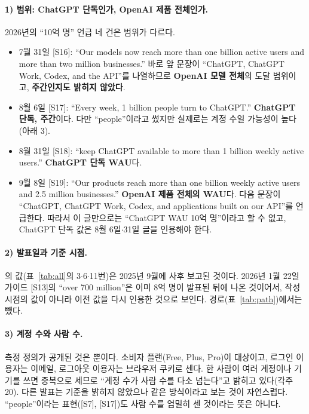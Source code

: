 \documentclass[11pt]{article}
\begin{document}
\paragraph{1) 범위: ChatGPT 단독인가, OpenAI 제품 전체인가.} 2026년의 ``10억 명'' 언급 네 건은 범위가 다르다.
\begin{itemize}
  \item 7월 31일 [S16]: ``Our models now reach more than one billion active users and more than two million businesses.'' 바로 앞 문장이 ``ChatGPT, ChatGPT Work, Codex, and the API''를 나열하므로 \textbf{OpenAI 모델 전체}의 도달 범위이고, \textbf{주간인지도 밝히지 않았다}.
  \item 8월 6일 [S17]: ``Every week, 1 billion people turn to ChatGPT.'' \textbf{ChatGPT 단독, 주간}이다. 다만 ``people''이라고 썼지만 실제로는 계정 수일 가능성이 높다(아래 3).
  \item 8월 31일 [S18]: ``keep ChatGPT available to more than 1 billion weekly active users.'' \textbf{ChatGPT 단독 WAU}다.
  \item 9월 8일 [S19]: ``Our products reach more than one billion weekly active users and 2.5 million businesses.'' \textbf{OpenAI 제품 전체의 WAU}다. 다음 문장이 ``ChatGPT, ChatGPT Work, Codex, and applications built on our API''를 언급한다. 따라서 이 글만으로는 ``ChatGPT WAU 10억 명''이라고 할 수 없고, ChatGPT 단독 값은 8월 6일$\cdot$31일 글을 인용해야 한다.
\end{itemize}

\paragraph{2) 발표일과 기준 시점.} \textcite{chatterji-2025-how-people-use-chatgpt}의 값(표~\ref{tab:all}의 3$\cdot$6$\cdot$11번)은 2025년 9월에 사후 보고된 것이다. 2026년 1월 22일 가이드 [S13]의 ``over 700 million''은 이미 8억 명이 발표된 뒤에 나온 것이어서, 작성 시점의 값이 아니라 이전 값을 다시 인용한 것으로 보인다. 경로(표~\ref{tab:path})에서는 뺐다.

\paragraph{3) 계정 수와 사람 수.} 측정 정의가 공개된 것은 \textcite{chatterji-2025-how-people-use-chatgpt}뿐이다. 소비자 플랜(Free, Plus, Pro)이 대상이고, 로그인 이용자는 이메일, 로그아웃 이용자는 브라우저 쿠키로 센다. 한 사람이 여러 계정이나 기기를 쓰면 중복으로 세므로 ``계정 수가 사람 수를 다소 넘는다''고 밝히고 있다(각주 20). 다른 발표는 기준을 밝히지 않았으나 같은 방식이라고 보는 것이 자연스럽다. ``people''이라는 표현([S7], [S17])도 사람 수를 엄밀히 센 것이라는 뜻은 아니다.
\end{document}
